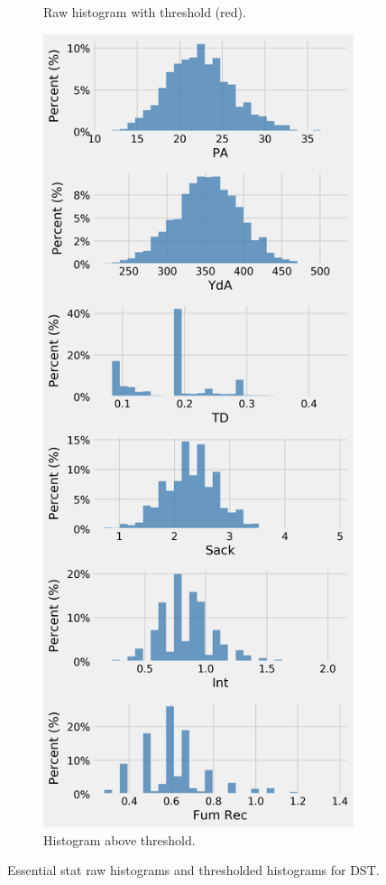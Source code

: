 \documentclass[12pt]{article}
\begin{document}
\begin{figure}[H]
\begin{subfigure}[b]{0.450\textwidth}
    \caption{Raw histogram with threshold (red).}
  \end{subfigure}
  \hfill
  \begin{subfigure}[b]{0.450\textwidth}
    \centering
    \includegraphics[width=1\textwidth]{../figures/threshold_hist_DST}
    \caption{Histogram above threshold.}
  \end{subfigure}
  \caption{Essential stat raw histograms and thresholded histograms for DST.}
\end{figure}
\end{document}

